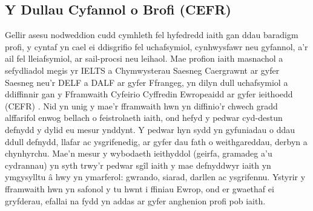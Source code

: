 \subsection{Y Dullau Cyfannol o Brofi (CEFR)}

Gellir asesu nodweddion cudd cymhleth fel hyfedredd iaith gan ddau baradigm profi, y cyntaf yn cael ei ddisgrifio fel uchafsymiol, cynhwysfawr neu gyfannol, a'r ail fel lleiafsymiol, ar sail-procsi neu leihaol. Mae profion iaith masnachol a sefydliadol megis yr IELTS a Chymwysterau Saesneg Caergrawnt ar gyfer Saesneg neu'r DELF a DALF ar gyfer Ffrangeg, yn dilyn dull uchafsymiol a ddiffinnir gan y Fframwaith Cyfeirio Cyffredin Ewropeaidd ar gyfer ieithoedd (CEFR) \parencite{europe_common_2020}. Nid yn unig y mae'r fframwaith hwn yn diffinio'r chwech gradd alffarifol enwog bellach o feistrolaeth iaith, ond hefyd y pedwar cyd-destun defnydd y dylid eu mesur ynddynt. Y pedwar hyn sydd yn gyfuniadau o ddau ddull defnydd, llafar ac ysgrifenedig, ar gyfer dau fath o weithgareddau, derbyn a chynhyrchu. Mae'n mesur y wybodaeth ieithyddol (geirfa, gramadeg a'u cydrannau) yn syth trwy'r pedwar sgîl iaith y mae defnyddwyr iaith yn ymgysylltu â hwy yn ymarferol: gwrando, siarad, darllen ac ysgrifennu. Ystyrir y fframwaith hwn yn safonol y tu hwnt i ffiniau Ewrop, ond er gwaethaf ei gryfderau, efallai na fydd yn addas ar gyfer anghenion profi pob iaith.

